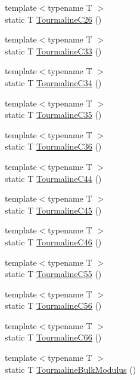\begin{DoxyCompactItemize}
{\footnotesize template$<$typename T $>$ }\\static T \mbox{\hyperlink{namespacempc_1_1data_aa461c998e0a5bcf69f782e2c7d11a63b}{Tourmaline\+C26}} ()
\item 
{\footnotesize template$<$typename T $>$ }\\static T \mbox{\hyperlink{namespacempc_1_1data_a866eb9c87a1d016b09f6e829a999c43b}{Tourmaline\+C33}} ()
\item 
{\footnotesize template$<$typename T $>$ }\\static T \mbox{\hyperlink{namespacempc_1_1data_aa5425a8533b2e1a4b43982db19637e68}{Tourmaline\+C34}} ()
\item 
{\footnotesize template$<$typename T $>$ }\\static T \mbox{\hyperlink{namespacempc_1_1data_ae767b00ff020e7423643e3a97966e53d}{Tourmaline\+C35}} ()
\item 
{\footnotesize template$<$typename T $>$ }\\static T \mbox{\hyperlink{namespacempc_1_1data_aa01502f87728f813beae59113f16879e}{Tourmaline\+C36}} ()
\item 
{\footnotesize template$<$typename T $>$ }\\static T \mbox{\hyperlink{namespacempc_1_1data_a7ced95807420aa278d9c046666fbd628}{Tourmaline\+C44}} ()
\item 
{\footnotesize template$<$typename T $>$ }\\static T \mbox{\hyperlink{namespacempc_1_1data_a7612c1ad1af1a2429072cf78044f5f6f}{Tourmaline\+C45}} ()
\item 
{\footnotesize template$<$typename T $>$ }\\static T \mbox{\hyperlink{namespacempc_1_1data_a00018020626f4720703fa5ad83d6ab75}{Tourmaline\+C46}} ()
\item 
{\footnotesize template$<$typename T $>$ }\\static T \mbox{\hyperlink{namespacempc_1_1data_a395bbe9d4a72888eb96863ee33802760}{Tourmaline\+C55}} ()
\item 
{\footnotesize template$<$typename T $>$ }\\static T \mbox{\hyperlink{namespacempc_1_1data_a14b58a8cde6ec2fd720c6404692e5c22}{Tourmaline\+C56}} ()
\item 
{\footnotesize template$<$typename T $>$ }\\static T \mbox{\hyperlink{namespacempc_1_1data_aa081531456ffbf5e26b0587b146b7a94}{Tourmaline\+C66}} ()
\item 
{\footnotesize template$<$typename T $>$ }\\static T \mbox{\hyperlink{namespacempc_1_1data_aeb5dc386f73e210b4aa2b3003b14a546}{Tourmaline\+Bulk\+Modulus}} ()

\end{DoxyCompactItemize}
